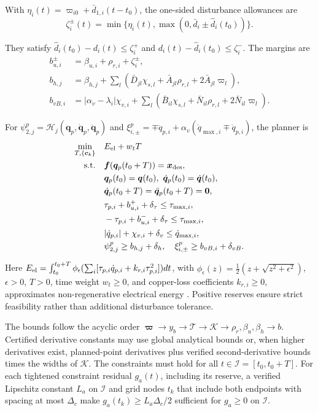 With $\eta_i(t)=\varpi_{i0}+\bar d_{1,i}(t-t_0)$, the one-sided disturbance allowances are
\[
\zeta_i^\pm(t)=\min\{\eta_i(t),\max(0,\bar d_i\pm\hat d_i(t_0))\}.
\]

They satisfy $\hat d_i(t_0)-d_i(t)\le\zeta_i^+$ and $d_i(t)-\hat d_i(t_0)\le\zeta_i^-$. The margins are
\begin{equation}
\begin{aligned}
b_{u,i}^\pm&=\beta_{u,i}+\rho_{r,i}+\zeta_i^\pm,\\
b_{h,j}&=\beta_{h,j}+\sum_l\left(
\bar D_{jl}\chi_{s,l}+\bar A_{jl}\rho_{r,l}+2\bar A_{jl}\varpi_l\right),\\
b_{vB,i}&=|\alpha_v-\lambda_i|\chi_{v,i}
+\sum_l\left(\bar B_{il}\chi_{s,l}
+\bar N_{il}\rho_{r,l}+2\bar N_{il}\varpi_l\right).
\end{aligned}
\label{eq_margins}
\end{equation}

For $\psi^p_{2,j}=\mathcal H_j(\bm q_p,\dot{\bm q}_p,\ddot{\bm q}_p)$ and $\xi^p_{i,\pm}=\mp\ddot q_{p,i}+\alpha_v(\dot q_{\max,i}\mp\dot q_{p,i})$, the planner is
\begin{equation}
\begin{aligned}
\min_{T,\{\bm c_k\}}\quad &E_{\rm el}+w_tT\\
\mathrm{s.t.}\quad&\bm f(\bm q_p(t_0+T))=\bm x_{\rm des},\\
&\bm q_p(t_0)=\bm q(t_0),\ \dot{\bm q}_p(t_0)=\dot{\bm q}(t_0),\\
&\dot{\bm q}_p(t_0+T)=\ddot{\bm q}_p(t_0+T)=\bm0,\\
&\tau_{p,i}+b_{u,i}^++\delta_\tau\le\tau_{\max,i},\\
&-\tau_{p,i}+b_{u,i}^-+\delta_\tau\le\tau_{\max,i},\\
&|\dot q_{p,i}|+\chi_{v,i}+\delta_v\le\dot q_{\max,i},\\
&\psi^p_{2,j}\ge b_{h,j}+\delta_h,\quad
\xi^p_{i,\pm}\ge b_{vB,i}+\delta_{vB}.
\end{aligned}
\label{eq_planner}
\end{equation}

Here $E_{\rm el}=\int_{t_0}^{t_0+T}\phi_\epsilon(\sum_i[\tau_{p,i}\dot q_{p,i}+k_{r,i}\tau_{p,i}^2])dt$, with $\phi_\epsilon(z)=\tfrac12(z+\sqrt{z^2+\epsilon^2})$, $\epsilon>0$, $T>0$, time weight $w_t\ge0$, and copper-loss coefficients $k_{r,i}\ge0$, approximates non-regenerative electrical energy \cite{r2,r4}. Positive reserves ensure strict feasibility rather than additional disturbance tolerance.

The bounds follow the acyclic order $\bm\varpi\to y_b\to\mathcal T\to\mathcal K\to\rho_r,\beta_u,\beta_h\to b$. Certified derivative constants may use global analytical bounds or, when higher derivatives exist, planned-point derivatives plus verified second-derivative bounds times the widths of $\mathcal K$. The constraints must hold for all $t\in\mathcal I=[t_0,t_0+T]$. For each tightened constraint residual $g_a(t)$, including its reserve, a verified Lipschitz constant $L_a$ on $\mathcal I$ and grid nodes $t_k$ that include both endpoints with spacing at most $\Delta_c$ make $g_a(t_k)\ge L_a\Delta_c/2$ sufficient for $g_a\ge0$ on $\mathcal I$.

